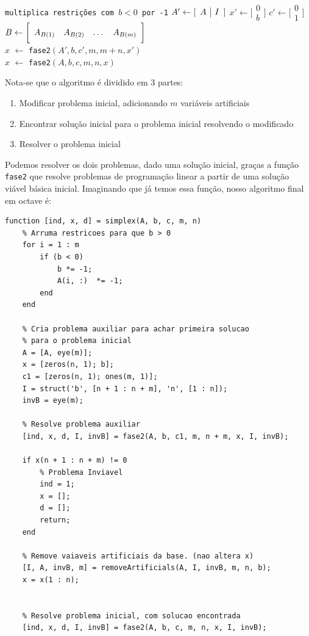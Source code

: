 \documentclass[12pt]{article}
\begin{document}
    \begin{algorithmic}
        \State \texttt{multiplica restrições com $b < 0$ por -1}
        \State $A' \gets [\begin{array}{c | c} A & I \end{array}]$
        \State $x' \gets \bigg [\begin{array}{c} 0 \\ \hline b \end{array} \bigg]$
        \State $c' \gets \bigg [\begin{array}{c} 0 \\ \hline 1 \end{array} \bigg]$
        \State $B \gets \bigg [\begin{array}{c c c c} A_{B(1)} & A_{B(2)} & \dots & A_{B(m)} \end{array} \bigg ]$ \\
        \State $x$ $\gets$ \texttt{fase2}$(A', b, c', m, m + n, x')$ \\
        \State $x$ $\gets$ \texttt{fase2}$(A, b, c, m, n, x)$ 
    \EndFunction
    \end{algorithmic}

    Nota-se que o algoritmo é dividido em 3 partes:
    \begin{enumerate}
        \item Modificar problema inicial, adicionando $m$ variáveis artificiais
        \item Encontrar solução inicial para o problema inicial resolvendo o modificado
        \item Resolver o problema inicial
    \end{enumerate}
    Podemos resolver os dois problemas, dado uma solução inicial, graças a função \texttt{fase2} que resolve problemas de programação linear a partir de uma solução viável básica inicial. Imaginando que já temos essa função, nosso algoritmo final em octave é:

    \begin{lstlisting}
function [ind, x, d] = simplex(A, b, c, m, n)
    % Arruma restricoes para que b > 0
    for i = 1 : m
        if (b < 0)
            b *= -1;
            A(i, :)  *= -1;
        end
    end

    % Cria problema auxiliar para achar primeira solucao 
    % para o problema inicial
    A = [A, eye(m)];
    x = [zeros(n, 1); b];
    c1 = [zeros(n, 1); ones(m, 1)];
    I = struct('b', [n + 1 : n + m], 'n', [1 : n]);
    invB = eye(m);

    % Resolve problema auxiliar
    [ind, x, d, I, invB] = fase2(A, b, c1, m, n + m, x, I, invB);

    if x(n + 1 : n + m) != 0
        % Problema Inviavel
        ind = 1;
        x = [];
        d = [];
        return;
    end

    % Remove vaiaveis artificiais da base. (nao altera x)
    [I, A, invB, m] = removeArtificials(A, I, invB, m, n, b);
    x = x(1 : n);


    % Resolve problema inicial, com solucao encontrada
    [ind, x, d, I, invB] = fase2(A, b, c, m, n, x, I, invB);
    \end{lstlisting}
\end{document}
